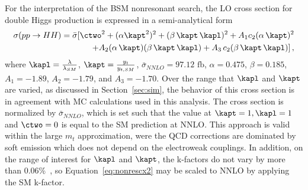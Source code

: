For the interpretation of the BSM nonresonant search, the LO cross section for double Higgs production
is expressed in a semi-analytical form~\cite{Contino:2012xk}
\begin{equation}
\begin{split}
\sigma (pp\to HH) = \bar{\sigma} [  \ctwo^2 + (\alpha \kapt^2)^2 +  (\beta\, \kapt \,\kapl)^2 + A_1 c_2 (\alpha\, \kapt)^2 \\
 + A_2 (\alpha\, \kapt) (\beta\, \kapt\, \kapl) + A_3\, c_2 (\beta\, \kapt\, \kapl) ] \,,
\end{split}
\label{eq:nonrescx2}
\end{equation}
where $\kapl = \frac{\lambda}{\lambda_{SM}}$, $\kapt = \frac{y_t}{y_{t,SM}}$, $\bar{\sigma}_{NNLO} = 97.12 \mbox{ fb}$, $\alpha = 0.475$, $\beta = 0.185$, $A_1 = -1.89$,
$A_2 = -1.79$, and $A_3 = -1.70$.
Over the range that $\kapl$ and $\kapt$ are varied, as discussed in Section~\ref{sec:sim},
the behavior of this cross section is in agreement with MC calculations used in this analysis.
The cross section is normalized by $\bar{\sigma}_{NNLO}$, which is set such that the value
at $\kapt = 1, \kapl = 1$ and $\ctwo = 0$ is equal to the SM prediction at NNLO.
This approach is valid within the large $m_t$ approximation, were the QCD corrections are dominated
by soft emission which does not depend on the electroweak couplings.
In addition, on the range of interest for $\kapl$ and $\kapt$, the k-factors do not vary by
more than 0.06\%~\cite{deFlorian:2013jea}, so Equation~\ref{eq:nonrescx2} may be scaled to NNLO
by applying the SM k-factor.

%  

